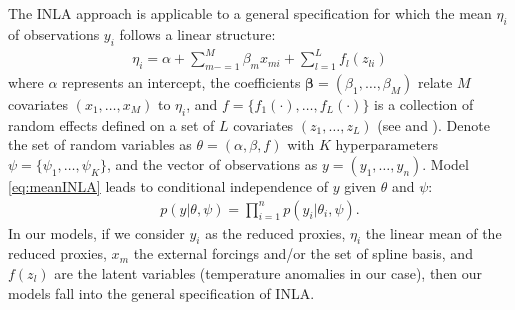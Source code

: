 \documentclass[11pt]{amsart}
\theoremstyle{plain}
\theoremstyle{definition}
\theoremstyle{remark}
\begin{document}

The INLA approach is applicable to a general specification for which the mean $\eta_i$ of  observations $y_i$ follows a  linear structure:
\begin{align}\label{eq:meanINLA}
  \eta_i = \alpha +\sum_{m-=1}^M\beta_mx_{mi}+\sum_{l=1}^Lf_l(z_{li})
\end{align}
where $\alpha$ represents an intercept, the coefficients
$\mathbf{\beta} = (\beta_1,\ldots,\beta_M)$ relate $M$ covariates
$(x_1,\ldots,x_M)$ to $\eta_i$, and $f = \{f_1(\cdot),\ldots,f_L(\cdot)\}$ is a collection of
random effects defined on a set of $L$ covariates $(z_1,\ldots,z_L)$ (see
\cite{Rue2009} and \cite{Blangiardo2013}). 
Denote the set of random variables as
$\theta = (\alpha,\beta,f)$ with $K$ hyperparameters $\psi =
\{\psi_1,\ldots,\psi_K\}$, and the vector of observations as $y=(y_1,\ldots,y_n)$. Model \eqref{eq:meanINLA} leads to conditional independence of $y$ given $\theta$ and $\psi$:
\begin{align*}
  p(y|\theta,\psi)=\prod_{i=1}^np(y_i|\theta_i,\psi).
\end{align*}
In our models, if we consider $y_i$ as the reduced proxies,  $\eta_i$ the
linear mean of the reduced proxies, $x_m$ the external forcings and/or the set
of spline basis, and $f(z_l)$ are the latent variables (temperature anomalies in
our case), then our models fall into the general specification of INLA. 
\end{document}
